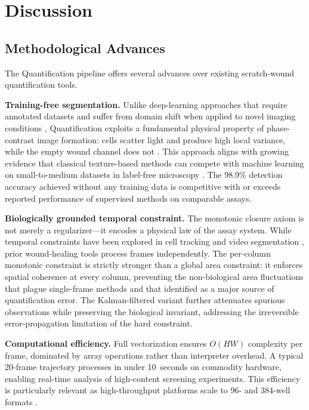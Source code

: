 \section{Discussion}

\subsection{Methodological Advances}

The Quantification pipeline offers several advances over existing scratch-wound quantification tools.

\textbf{Training-free segmentation.} Unlike deep-learning approaches that require annotated datasets \citep{Ronneberger2015,Dogru2024,Lehmann2024,Naser2025} and suffer from domain shift when applied to novel imaging conditions \citep{Oldenburg2021}, Quantification exploits a fundamental physical property of phase-contrast image formation: cells scatter light and produce high local variance, while the empty wound channel does not \citep{Yin2012}. This approach aligns with growing evidence that classical texture-based methods can compete with machine learning on small-to-medium datasets in label-free microscopy \citep{Ambrossio2022,Vicar2019}. The 98.9\% detection accuracy achieved without any training data is competitive with or exceeds reported performance of supervised methods on comparable assays.

\textbf{Biologically grounded temporal constraint.} The monotonic closure axiom is not merely a regularizer---it encodes a physical law of the assay system. While temporal constraints have been explored in cell tracking \citep{Bragantini2025,Lee2023} and video segmentation \citep{Guan2021}, prior wound-healing tools process frames independently. The per-column monotonic constraint is strictly stronger than a global area constraint: it enforces spatial coherence at every column, preventing the non-biological area fluctuations that plague single-frame methods and that \citet{Treloar2013} identified as a major source of quantification error. The Kalman-filtered variant further attenuates spurious observations while preserving the biological invariant, addressing the irreversible error-propagation limitation of the hard constraint.

\textbf{Computational efficiency.} Full vectorization ensures $O(HW)$ complexity per frame, dominated by array operations rather than interpreter overhead. A typical 20-frame trajectory processes in under 10~seconds on commodity hardware, enabling real-time analysis of high-content screening experiments. This efficiency is particularly relevant as high-throughput platforms scale to 96- and 384-well formats \citep{Zordan2011,Yarrow2004,Schmidt2024}.


